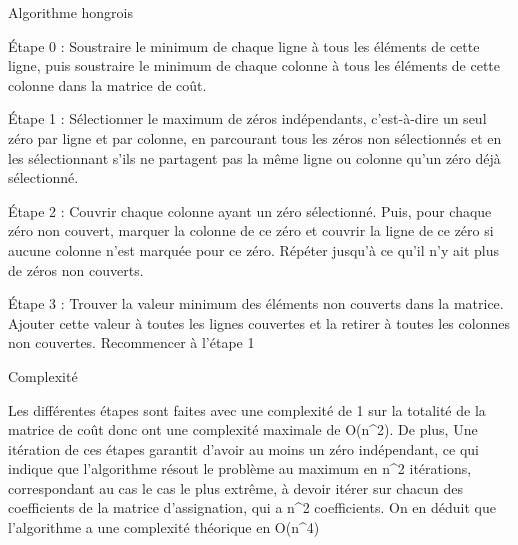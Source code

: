 \documentclass[
  ignorenonframetext,
]{beamer}
\begin{document}
\begin{frame}{}
\protect\hypertarget{section-13}{}
Algorithme hongrois

Étape 0 : Soustraire le minimum de chaque ligne à tous les éléments de
cette ligne, puis soustraire le minimum de chaque colonne à tous les
éléments de cette colonne dans la matrice de coût.

Étape 1 : Sélectionner le maximum de zéros indépendants, c'est-à-dire un
seul zéro par ligne et par colonne, en parcourant tous les zéros non
sélectionnés et en les sélectionnant s'ils ne partagent pas la même
ligne ou colonne qu'un zéro déjà sélectionné.

Étape 2 : Couvrir chaque colonne ayant un zéro sélectionné. Puis, pour
chaque zéro non couvert, marquer la colonne de ce zéro et couvrir la
ligne de ce zéro si aucune colonne n'est marquée pour ce zéro. Répéter
jusqu'à ce qu'il n'y ait plus de zéros non couverts.

Étape 3 : Trouver la valeur minimum des éléments non couverts dans la
matrice. Ajouter cette valeur à toutes les lignes couvertes et la
retirer à toutes les colonnes non couvertes. Recommencer à l'étape 1
\end{frame}

\begin{frame}{}
\protect\hypertarget{section-14}{}
Complexité

Les différentes étapes sont faites avec une complexité de 1 sur la
totalité de la matrice de coût donc ont une complexité maximale de
O(n\^{}2). De plus, Une itération de ces étapes garantit d'avoir au
moins un zéro indépendant, ce qui indique que l'algorithme résout le
problème au maximum en n\^{}2 itérations, correspondant au cas le cas le
plus extrême, à devoir itérer sur chacun des coefficients de la matrice
d'assignation, qui a n\^{}2 coefficients. On en déduit que l'algorithme
a une complexité théorique en O(n\^{}4)
\end{frame}
\end{document}
